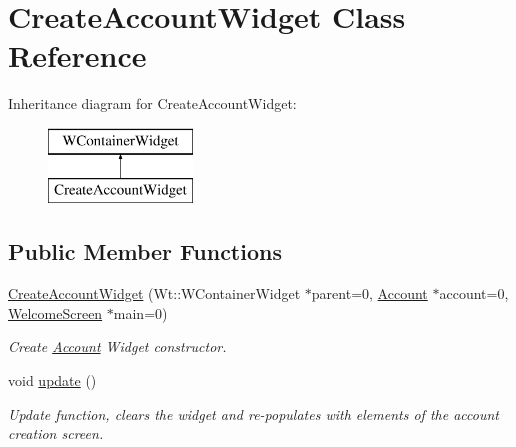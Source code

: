 \hypertarget{classCreateAccountWidget}{}\section{Create\+Account\+Widget Class Reference}
\label{classCreateAccountWidget}
Inheritance diagram for Create\+Account\+Widget\+:\begin{figure}[H]
\begin{center}
\leavevmode
\includegraphics[height=2.000000cm]{classCreateAccountWidget}
\end{center}
\end{figure}
\subsection*{Public Member Functions}
\begin{DoxyCompactItemize}
\item 
\hyperlink{classCreateAccountWidget_afe9017adc69291027c3ebd3f9d448a4c}{Create\+Account\+Widget} (Wt\+::\+W\+Container\+Widget $\ast$parent=0, \hyperlink{classAccount}{Account} $\ast$account=0, \hyperlink{classWelcomeScreen}{Welcome\+Screen} $\ast$main=0)
\begin{DoxyCompactList}\small\item\em Create \hyperlink{classAccount}{Account} Widget constructor. \end{DoxyCompactList}\item 
void \hyperlink{classCreateAccountWidget_a7561efaf407aa50a1dc8fe1c8c099d85}{update} ()
\begin{DoxyCompactList}\small\item\em Update function, clears the widget and re-\/populates with elements of the account creation screen. \end{DoxyCompactList}\end{DoxyCompactItemize}
